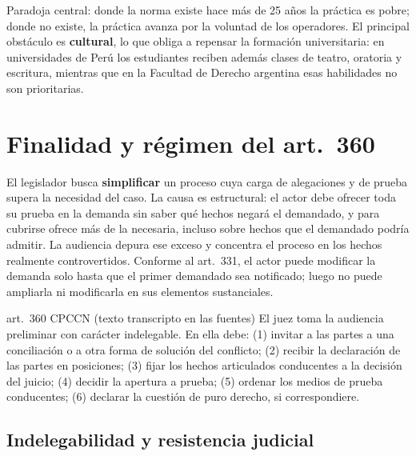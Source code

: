 \documentclass[12pt,oneside]{book}
\begin{document}
\begin{important}
Paradoja central: donde la norma existe hace más de 25 años la práctica es pobre; donde no existe, la práctica avanza por la voluntad de los operadores. El principal obstáculo es \textbf{cultural}, lo que obliga a repensar la formación universitaria: en universidades de Perú los estudiantes reciben además clases de teatro, oratoria y escritura, mientras que en la Facultad de Derecho argentina esas habilidades no son prioritarias.
\end{important}

\section{Finalidad y régimen del art.~360}

El legislador busca \textbf{simplificar} un proceso cuya carga de alegaciones y de prueba supera la necesidad del caso. La causa es estructural: el actor debe ofrecer toda su prueba en la demanda sin saber qué hechos negará el demandado, y para cubrirse ofrece más de la necesaria, incluso sobre hechos que el demandado podría admitir. La audiencia depura ese exceso y concentra el proceso en los hechos realmente controvertidos. Conforme al art.~331, el actor puede modificar la demanda solo hasta que el primer demandado sea notificado; luego no puede ampliarla ni modificarla en sus elementos sustanciales.

\begin{norma}{art.~360 CPCCN (texto transcripto en las fuentes)}
El juez toma la audiencia preliminar con carácter indelegable. En ella debe: (1) invitar a las partes a una conciliación o a otra forma de solución del conflicto; (2) recibir la declaración de las partes en posiciones; (3) fijar los hechos articulados conducentes a la decisión del juicio; (4) decidir la apertura a prueba; (5) ordenar los medios de prueba conducentes; (6) declarar la cuestión de puro derecho, si correspondiere.
\end{norma}


\subsection{Indelegabilidad y resistencia judicial}
\end{document}

